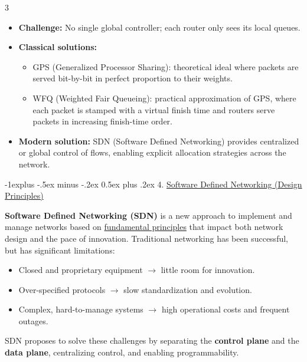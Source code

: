 \documentclass[a4paper, 9pt, landscape]{article}
\makeatletter
\renewcommand{\section}{\@startsection{subsection}{2}{0mm}%
                                {-1explus -.5ex minus -.2ex}%
                                {0.5ex plus .2ex}%
                                {\normalfont\normalsize\bfseries}}
\makeatother
\begin{document}
\begin{multicols*}{3}
\begin{itemize}
  \item \textbf{Challenge:} No single global controller; each router only sees its local queues.
  \item \textbf{Classical solutions:}
    \begin{itemize}
      \item GPS (Generalized Processor Sharing): theoretical ideal where packets are served bit-by-bit in perfect proportion to their weights.
      \item WFQ (Weighted Fair Queueing): practical approximation of GPS, where each packet is stamped with a virtual finish time and routers serve packets in increasing finish-time order.
    \end{itemize}
  \item \textbf{Modern solution:} SDN (Software Defined Networking) provides centralized or global control of flows, enabling explicit allocation strategies across the network.
\end{itemize}


% 
%

\columnbreak


\section{4. \underline{Software Defined Networking (Design Principles)}}

\textbf{Software Defined Networking (SDN)} is a new approach to implement and manage networks based on 
\underline{fundamental principles} that impact both network design and the pace of innovation.  
Traditional networking has been successful, but has significant limitations:
\begin{itemize}
  \item Closed and proprietary equipment $\rightarrow$ little room for innovation.
  \item Over-specified protocols $\rightarrow$ slow standardization and evolution.
  \item Complex, hard-to-manage systems $\rightarrow$ high operational costs and frequent outages.
\end{itemize}

SDN proposes to solve these challenges by separating the \textbf{control plane} and the \textbf{data plane}, 
centralizing control, and enabling programmability.


\end{multicols*}
\end{document}
